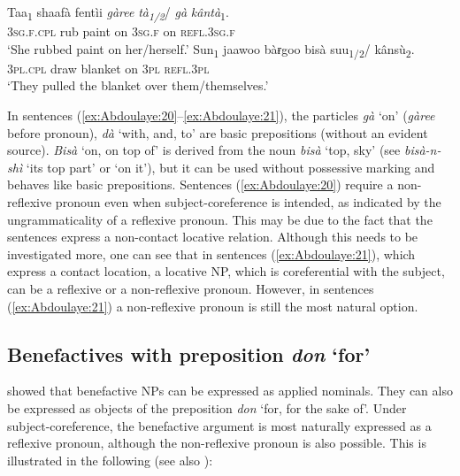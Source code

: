 \documentclass[output=paper]{langscibook}
\begin{document}
        
\ea%
    \label{ex:Abdoulaye:21}
    \ea \label{ex:Abdoulaye:21a}
    \gll Taa\textsubscript{1}  shaafà  fentìi  \textit{gàree}  \textit{tà\textsubscript{1/2}}/  \textit{gà}  \textit{kântà}\textsubscript{1}.\\
    \textsc{3sg.f.cpl}  rub  paint  on  \textsc{3sg.f}  on  \textsc{refl.3sg.f}\\
    \glt `She rubbed paint on her/herself.’
    \ex \label{ex:Abdoulaye:21b}
    \gll Sun\textsubscript{1}  jaawoo  bàɍgoo  bisà  suu\textsubscript{1/2}/  kânsù\textsubscript{2}.\\
    \textsc{3pl.cpl}  draw  blanket  on  \textsc{3pl}  \textsc{refl.3pl}\\
    \glt `They pulled the blanket over them/themselves.’
    \z
\z

        

In sentences (\ref{ex:Abdoulaye:20}--\ref{ex:Abdoulaye:21}), the particles \textit{gà} ‘on’ (\textit{gàree} before pronoun), \textit{dà} ‘with, and, to’ are basic prepositions (without an evident source). \textit{Bisà} ‘on, on top of’ is derived from the noun \textit{bisà} ‘top,  sky’ (see \textit{bisà-n-shì} ‘its top part’ or ‘on it’), but it can be used without possessive marking and behaves like basic prepositions. Sentences (\ref{ex:Abdoulaye:20}) require a non-reflexive pronoun even when subject-coreference is intended, as indicated by the ungrammaticality of a reflexive pronoun. This may be due to the fact that the sentences express a non-contact locative relation. Although this needs to be investigated more, one can see that in sentences (\ref{ex:Abdoulaye:21}), which express a contact location, a locative NP, which is coreferential with the subject, can be a reflexive or a non-reflexive pronoun. However, in sentences (\ref{ex:Abdoulaye:21}) a non-reflexive pronoun is still the most natural option.


\subsection{Benefactives with preposition \textit{don} ‘for’}\label{sec:Abdoulaye:4.4}

 showed that benefactive NPs can be expressed as applied nominals. They can also be expressed as objects of the preposition \textit{don} ‘for, for the sake of’. Under subject-coreference, the benefactive argument is most naturally expressed as a reflexive pronoun, although the non-reflexive pronoun is also possible. This is illustrated in the following (see also \citealt[524f]{Newman2000}):
\end{document}
